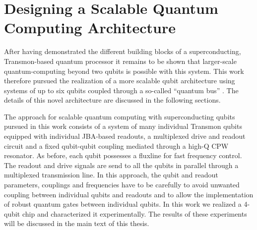 \section{Designing a Scalable Quantum Computing Architecture}

After having demonstrated the different building blocks of a superconducting, Transmon-based quantum processor it remains to be shown that larger-scale quantum-computing beyond two qubits is possible with this system. This work therefore pursued the realization of a more scalable qubit architecture using systems of up to six qubits coupled through a so-called ``quantum bus'' \citep{majer_coupling_2007}. The details of this novel architecture are discussed in the following sections.

The approach for scalable quantum computing with superconducting qubits pursued in this work consists of a system of many individual Transmon qubits equipped with individual JBA-based readouts, a multiplexed drive and readout circuit and a fixed qubit-qubit coupling mediated through a high-Q CPW resonator. As before, each qubit possesses a fluxline for fast frequency control. The readout and drive signals are send to all the qubits in parallel through a multiplexed transmission line. In this approach, the qubit and readout parameters, couplings and frequencies have to be carefully to avoid unwanted coupling between individual qubits and readouts and to allow the implementation of robust quantum gates between individual qubits. In this work we realized a 4-qubit chip and characterized it experimentally. The results of these experiments will be discussed in the main text of this thesis.

